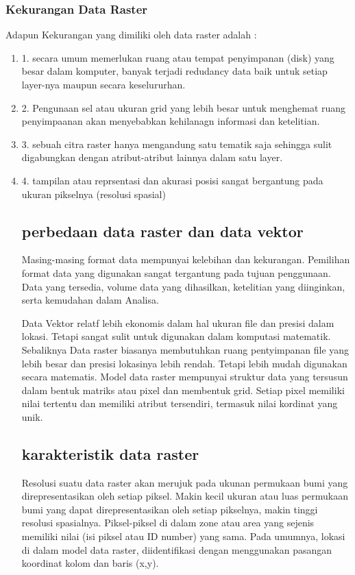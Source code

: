\subsubsection{Kekurangan Data Raster}
Adapun Kekurangan yang dimiliki oleh data raster adalah :
	\begin{enumerate}
		\item 1. secara umum memerlukan ruang atau tempat penyimpanan (disk) yang besar dalam komputer, banyak terjadi redudancy data baik untuk setiap layer-nya maupun secara keselururhan.
		\item 2. Pengunaan sel atau ukuran grid yang lebih besar untuk menghemat ruang penyimpaanan akan menyebabkan kehilanagn informasi dan ketelitian.
		\item 3. sebuah citra raster hanya mengandung satu tematik saja sehingga sulit digabungkan dengan atribut-atribut lainnya dalam satu layer.
		\item 4. tampilan atau reprsentasi dan akurasi posisi sangat bergantung pada ukuran pikselnya (resolusi spasial)


\subsection{perbedaan data raster dan data vektor}
Masing-masing format data mempunyai kelebihan dan kekurangan.
Pemilihan format data yang digunakan sangat tergantung pada tujuan penggunaan. 
Data yang tersedia, volume data yang dihasilkan, ketelitian yang diinginkan, serta kemudahan dalam Analisa.

Data Vektor relatf lebih ekonomis dalam hal ukuran file dan presisi dalam lokasi. Tetapi sangat sulit untuk 
digunakan dalam komputasi matematik.
Sebaliknya Data raster biasanya membutuhkan ruang pentyimpanan file yang lebih besar dan presisi lokasinya lebih rendah.
Tetapi lebih mudah digunakan secara matematis.
Model data raster mempunyai struktur data yang tersusun dalam bentuk matriks atau pixel dan membentuk grid. 
Setiap pixel memiliki nilai tertentu dan memiliki atribut tersendiri, termasuk nilai kordinat yang unik.



\subsection{karakteristik data raster}
Resolusi suatu data raster akan merujuk pada ukunan permukaan bumi yang direpresentasikan oleh setiap piksel. 
Makin kecil ukuran atau luas permukaan bumi yang dapat direpresentasikan oleh setiap pikselnya, 
makin tinggi resolusi spasialnya.
Piksel-piksel di dalam zone atau area yang sejenis memiliki nilai (isi piksel atau ID number) yang sama. 
Pada umumnya, lokasi di dalam model data raster, diidentifikasi dengan menggunakan pasangan koordinat kolom dan baris (x,y).


\end{enumerate}
